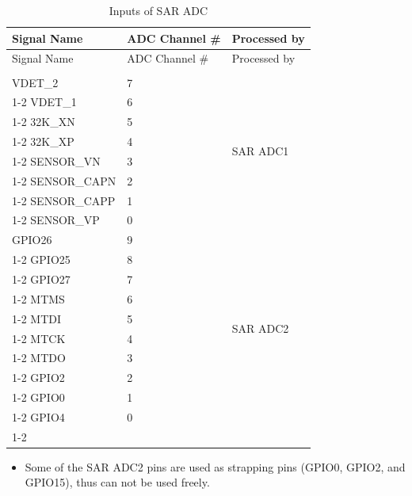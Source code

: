 \documentclass[main\_\_EN.tex]{subfiles}
\begin{document}
\begin{longtable}{|p{5cm}|p{5cm}|p{4cm}| }
    \caption{Inputs of SAR ADC}
    \label{table:adc inputs}
    \\\hline
    \rowcolor{lightgray}
    Signal Name &  ADC Channel \# & Processed by \\\hline
    \endfirsthead
    \hline
    \rowcolor{lightgray}
    Signal Name  & ADC Channel \# & Processed by \\\hline \\\hline
    \endhead
    \hline
    \endfoot
    VDET\_2      &  7  & \multirow{8}{*}{SAR ADC1} \\ \cline{1-2}
    VDET\_1      &  6  & \\ \cline{1-2}
    32K\_XN      &  5  & \\ \cline{1-2}
    32K\_XP     &  4  & \\ \cline{1-2}
    SENSOR\_VN    &  3  & \\ \cline{1-2}
    SENSOR\_CAPN   & 2  & \\ \cline{1-2}
    SENSOR\_CAPP   &  1  & \\ \cline{1-2}
    SENSOR\_VP    &  0  & \\ \hline
    GPIO26       &  9  & \multirow{10}{*}{SAR ADC2} \\ \cline{1-2}
    GPIO25      &  8  & \\ \cline{1-2}
    GPIO27      &  7  & \\ \cline{1-2}
    MTMS         &  6  & \\ \cline{1-2}
    MTDI          &  5  & \\ \cline{1-2}
    MTCK          &  4  & \\ \cline{1-2}
    MTDO          &  3  & \\ \cline{1-2}
    GPIO2        &  2  & \\ \cline{1-2}
    GPIO0        &  1  & \\ \cline{1-2}
    GPIO4       &  0  & \\ \cline{1-2}
\end{longtable}
\vspace{-1em}
\begin{tiplisting}
\begin{itemize}
\vspace{-2em}
\item Some of the SAR ADC2 pins are used as strapping pins (GPIO0, GPIO2, and GPIO15), thus can not be used freely. 
\end{itemize}
\end{tiplisting}
\end{document}
